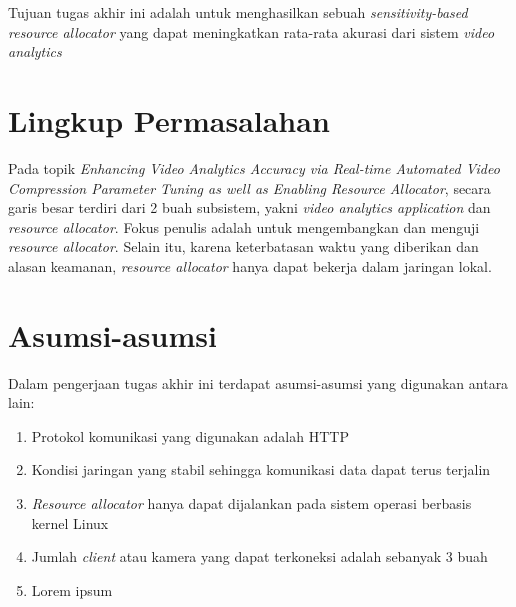 Tujuan tugas akhir ini adalah untuk menghasilkan sebuah \textit{sensitivity-based resource allocator} yang dapat meningkatkan
rata-rata akurasi dari sistem \textit{video analytics}

\section{Lingkup Permasalahan}

Pada topik \textit{Enhancing Video Analytics Accuracy via
Real-time Automated Video Compression Parameter Tuning as
well as Enabling Resource Allocator}, secara garis besar terdiri dari 2 buah subsistem, yakni \textit{video analytics application} dan \textit{resource allocator}.
Fokus penulis adalah untuk mengembangkan dan menguji \textit{resource allocator}. 
Selain itu, karena keterbatasan waktu yang diberikan dan alasan keamanan,
\textit{resource allocator} hanya dapat bekerja dalam jaringan lokal.


\section{Asumsi-asumsi}

Dalam pengerjaan tugas akhir ini terdapat asumsi-asumsi yang digunakan antara lain:

\begin{enumerate}
	\item Protokol komunikasi yang digunakan adalah HTTP
	\item Kondisi jaringan yang stabil sehingga komunikasi data dapat terus terjalin
	\item \textit{Resource allocator} hanya dapat dijalankan pada sistem operasi berbasis kernel Linux
	\item Jumlah \textit{client} atau kamera yang dapat terkoneksi adalah sebanyak 3 buah
	\item Lorem ipsum
\end{enumerate}

